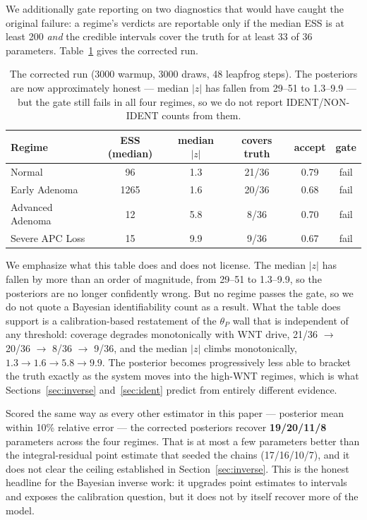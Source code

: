 \documentclass[11pt]{article}
\newcommand{\thP}{\theta_P}
\begin{document}
We additionally gate reporting on two diagnostics that would have caught the
original failure: a regime's verdicts are reportable only if the median ESS is
at least 200 \emph{and} the credible intervals cover the truth for at least
33 of 36 parameters. Table~\ref{tab:bayesfixed} gives the corrected run.

\begin{table}[H]
\centering
\begin{tabular}{lccccc}
\toprule
\textbf{Regime} & \textbf{ESS (median)} & \textbf{median $|z|$} &
\textbf{covers truth} & \textbf{accept} & \textbf{gate} \\
\midrule
Normal            & 96   & 1.3 & 21/36 & 0.79 & fail \\
Early Adenoma     & 1265 & 1.6 & 20/36 & 0.68 & fail \\
Advanced Adenoma  & 12   & 5.8 &  8/36 & 0.70 & fail \\
Severe APC Loss   & 15   & 9.9 &  9/36 & 0.67 & fail \\
\bottomrule
\end{tabular}
\caption{The corrected run (3000 warmup, 3000 draws, 48 leapfrog steps). The
posteriors are now approximately honest --- median $|z|$ has fallen from
29--51 to 1.3--9.9 --- but the gate still fails in all four regimes, so we do
not report IDENT/NON-IDENT counts from them.}
\label{tab:bayesfixed}
\end{table}

We emphasize what this table does and does not license. The median $|z|$ has
fallen by more than an order of magnitude, from 29--51 to 1.3--9.9, so the
posteriors are no longer confidently wrong. But no regime passes the gate, so
we do not quote a Bayesian identifiability count as a result. What the table
does support is a calibration-based restatement of the $\thP$ wall that is
independent of any threshold: coverage degrades monotonically with WNT drive,
21/36 $\to$ 20/36 $\to$ 8/36 $\to$ 9/36, and the median $|z|$ climbs
monotonically, $1.3 \to 1.6 \to 5.8 \to 9.9$. The posterior becomes
progressively less able to bracket the truth exactly as the system moves into
the high-WNT regimes, which is what Sections~\ref{sec:inverse}
and~\ref{sec:ident} predict from entirely different evidence.

Scored the same way as every other estimator in this paper --- posterior mean
within 10\% relative error --- the corrected posteriors recover
\textbf{19/20/11/8} parameters across the four regimes. That is at most a few
parameters better than the integral-residual point estimate that seeded the
chains (17/16/10/7), and it does not clear the ceiling established in
Section~\ref{sec:inverse}. This is the honest headline for the Bayesian inverse
work: it upgrades point estimates to intervals and exposes the calibration
question, but it does not by itself recover more of the model.
\end{document}
